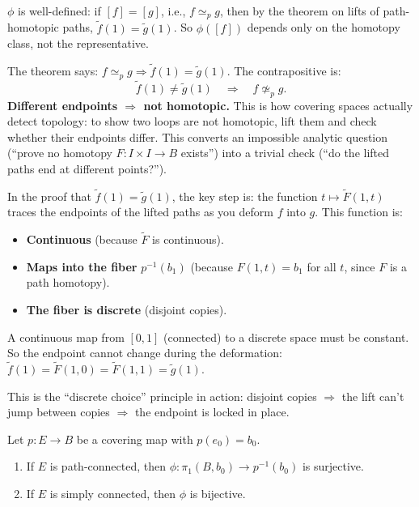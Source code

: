 \documentclass[11pt]{report}
\begin{document}
\begin{rembox}
$\phi$ is well-defined: if $[f] = [g]$, i.e., $f \simeq_p g$, then by the theorem on lifts of path-homotopic paths, $\tilde{f}(1) = \tilde{g}(1)$. So $\phi([f])$ depends only on the homotopy class, not the representative.
\end{rembox}

\begin{rembox}
The theorem says: $f \simeq_p g \Rightarrow \tilde{f}(1) = \tilde{g}(1)$. The contrapositive is:
\[\tilde{f}(1) \neq \tilde{g}(1) \quad \Longrightarrow \quad f \not\simeq_p g.\]
\textbf{Different endpoints $\Rightarrow$ not homotopic.} This is how covering spaces actually detect topology: to show two loops are not homotopic, lift them and check whether their endpoints differ. This converts an impossible analytic question (``prove no homotopy $F: I \times I \to B$ exists'') into a trivial check (``do the lifted paths end at different points?'').
\end{rembox}

\begin{rembox}
In the proof that $\tilde{f}(1) = \tilde{g}(1)$, the key step is: the function $t \mapsto \tilde{F}(1, t)$ traces the endpoints of the lifted paths as you deform $f$ into $g$. This function is:
\begin{itemize}[nosep]
    \item \textbf{Continuous} (because $\tilde{F}$ is continuous).
    \item \textbf{Maps into the fiber} $p^{-1}(b_1)$ (because $F(1,t) = b_1$ for all $t$, since $F$ is a path homotopy).
    \item \textbf{The fiber is discrete} (disjoint copies).
\end{itemize}
A continuous map from $[0,1]$ (connected) to a discrete space must be constant. So the endpoint cannot change during the deformation: $\tilde{f}(1) = \tilde{F}(1, 0) = \tilde{F}(1, 1) = \tilde{g}(1)$.

This is the ``discrete choice'' principle in action: disjoint copies $\Rightarrow$ the lift can't jump between copies $\Rightarrow$ the endpoint is locked in place.
\end{rembox}

\begin{thmbox}
Let $p: E \to B$ be a covering map with $p(e_0) = b_0$.
\begin{enumerate}
    \item If $E$ is path-connected, then $\phi: \pi_1(B, b_0) \to p^{-1}(b_0)$ is surjective.
    \item If $E$ is simply connected, then $\phi$ is bijective.
\end{enumerate}
\end{thmbox}
\end{document}
